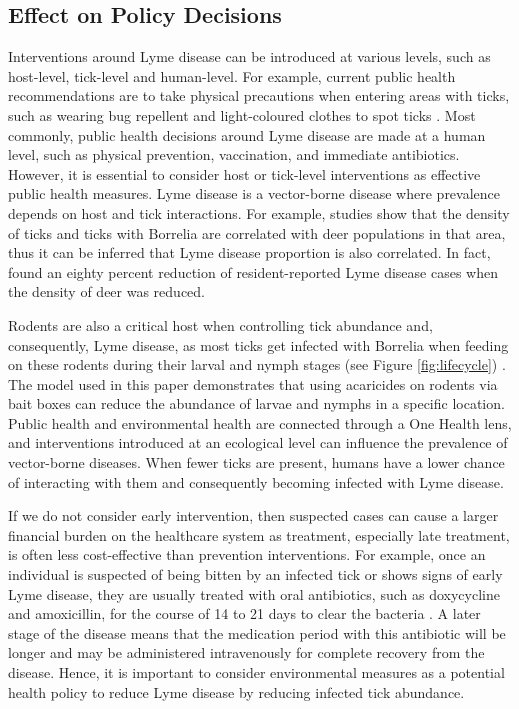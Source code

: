 \documentclass[12pt, centerh1]{article}
\newcommand{\sophie}[1]{{\textcolor{purple}{$\langle$SS: #1$\rangle$}}}
\begin{document}
\subsection{Effect on Policy Decisions}

Interventions around Lyme disease can be introduced at various levels, such as host-level, tick-level and human-level. For example, current public health recommendations are to take physical precautions when entering areas with ticks, such as wearing bug repellent and light-coloured clothes to spot ticks \citep{govcan}. Most commonly, public health decisions around Lyme disease are made at a human level, such as physical prevention, vaccination, and immediate antibiotics. However, it is essential to consider host or tick-level interventions as effective public health measures. Lyme disease is a vector-borne disease where prevalence depends on host and tick interactions. %
For example, studies show that the density of ticks and ticks with Borrelia are correlated with deer populations in that area, thus it can be inferred that Lyme disease proportion is also correlated. In fact, \citet{kilpatrick2014relationship}found an eighty percent reduction of resident-reported Lyme disease cases when the density of deer was reduced.  

Rodents are also a critical host when controlling tick abundance and, consequently, Lyme disease, as most ticks get infected with Borrelia when feeding on these rodents during their larval and nymph stages (see Figure \ref{fig:lifecycle}) \citep{radolf2012ticks}. The model used in this paper demonstrates that using acaricides on rodents via bait boxes can reduce the abundance of larvae and nymphs in a specific location. Public health and environmental health are connected through a One Health lens, and interventions introduced at an ecological level can influence the prevalence of vector-borne diseases. When fewer ticks are present, humans have a lower chance of interacting with them and consequently becoming infected with Lyme disease. 

If we do not consider early intervention, then suspected cases can cause a larger financial burden on the healthcare system as treatment, especially late treatment, is often less cost-effective than prevention interventions. For example, once an individual is suspected of being bitten by an infected tick or shows signs of early Lyme disease, they are usually treated with oral antibiotics, such as doxycycline and amoxicillin, for the course of 14 to 21 days to clear the bacteria \citep{borrelia_shapiro}. A later stage of the disease means that the medication period with this antibiotic will be longer and may be administered intravenously for complete recovery from the disease. Hence, it is important to consider environmental measures as a potential health policy to reduce Lyme disease by reducing infected tick abundance.
\end{document}
